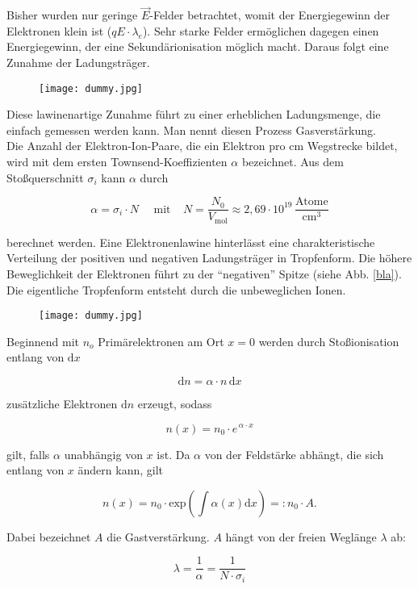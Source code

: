Bisher wurden nur geringe $\vec{E}$-Felder betrachtet, womit der Energiegewinn der Elektronen klein
ist ($qE\cdot\lambda_e$). Sehr starke Felder ermöglichen dagegen einen Energiegewinn, der eine
Sekundärionisation möglich macht. Daraus folgt eine Zunahme der Ladungsträger.

\begin{figure}[H]
	\centering
	\texttt{[image: dummy.jpg]}
\end{figure}

Diese lawinenartige Zunahme führt zu einer erheblichen Ladungsmenge, die einfach gemessen werden
kann. Man nennt diesen Prozess Gasverstärkung.
\\
Die Anzahl der Elektron-Ion-Paare, die ein Elektron pro cm Wegstrecke bildet, wird mit dem ersten
Townsend-Koeffizienten $\alpha$ bezeichnet. Aus dem Stoßquerschnitt $\sigma_i$ kann $\alpha$ durch 

\[\alpha = \sigma_i\cdot N~~~~~~\text{mit}~~~~~ N=\frac{N_0}{V_{\text{mol}}}\approx
2{,}69\cdot10^{19}\,\frac{\text{Atome}}{\text{cm}^3} \]

berechnet werden. Eine Elektronenlawine hinterlässt eine charakteristische Verteilung der positiven
und negativen Ladungsträger in Tropfenform. Die höhere Beweglichkeit der Elektronen führt zu der
"`negativen"' Spitze (siehe Abb. \ref{bla}). Die eigentliche Tropfenform entsteht durch die
unbeweglichen Ionen.

\begin{figure}[H]
	\centering
	\texttt{[image: dummy.jpg]}
\end{figure}

Beginnend mit $n_o$ Primärelektronen am Ort $x=0$ werden durch Stoßionisation entlang von
$\mathrm{d}x$

\[ \mathrm{d}n = \alpha\cdot n\, \mathrm{d}x  \]

zusätzliche Elektronen $\mathrm{d}n$ erzeugt, sodass

\[n(x)=n_0\cdot e^{\,\alpha\cdot x}   \]

gilt, falls $\alpha$ unabhängig von $x$ ist. Da $\alpha$ von der Feldstärke abhängt, die sich
entlang von $x$ ändern kann, gilt

\[n(x)=n_0\cdot \text{exp}\left(\int\alpha(x)\mathrm{d}x \right)=:n_0\cdot A  .\]

Dabei bezeichnet $A$ die Gastverstärkung. $A$ hängt von der freien Weglänge $\lambda$ ab:

\[\lambda =\frac{1}{\alpha}=\frac{1}{N\cdot\sigma_i}  \]

